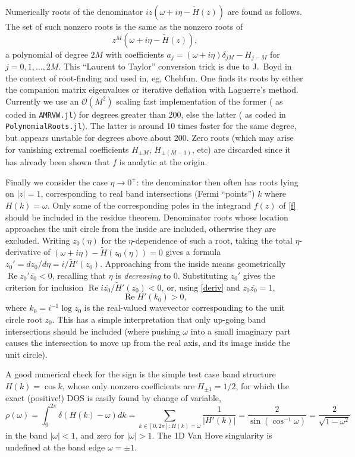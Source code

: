 \documentclass[11pt]{article}
\newcommand{\bigO}{{\mathcal O}}
\DeclareMathOperator{\re}{Re}
\newcommand{\om}{\omega}
\newcommand{\tH}{\tilde H}
\begin{document}
Numerically roots of the denominator $iz(\om + i\eta - \tH(z))$
are found as follows.
The set of such nonzero roots is the same as the nonzero roots of
$$
z^M(\om + i\eta - \tH(z)),
$$
a polynomial of degree $2M$ with coefficients
$a_j = (\om+i\eta)\delta_{jM} - H_{j-M}$ for $j=0,1,\dots,2M$.
This ``Laurent to Taylor'' conversion
trick is due to J.\ Boyd in the context of root-finding and used in, eg,
Chebfun.
One finds its roots by either the companion matrix
eigenvalues or iterative deflation with Laguerre's method.
Currently we use an $\bigO(M^2)$ scaling fast implementation of the former
(\cite{aurentz1,aurentz2} as coded in \texttt{AMRVW.jl})
for degrees greater than 200, else the
latter (\cite{skowron} as coded in \texttt{PolynomialRoots.jl}).
The latter is around 10 times faster for the same degree, but
appears unstable for degrees above about 200.
Zero roots (which may arise for vanishing extremal coefficients
$H_{\pm M}$, $H_{\pm (M-1)}$, etc) are discarded since it has
already been shown that $f$ is analytic at the origin.

Finally we consider
the case $\eta\to0^+$: the denominator then often has roots lying on $|z|=1$,
corresponding to real band intersections (Fermi ``points'')
$k$ where $H(k)=\om$.
Only some of the corresponding poles in the integrand $f(z)$ of \eqref{f}
should be included in the residue theorem.
Denominator roots whose location approaches the unit circle from the inside
are included, otherwise they are excluded.
Writing $z_0(\eta)$ for the $\eta$-dependence of such a root,
taking the total $\eta$-derivative of $(\om+i\eta)-\tH(z_0(\eta)) = 0$
gives a formula $z_0' = dz_0/d\eta = i/\tH'(z_0)$.
Approaching from the inside means geometrically
$\re z_0' \overline{z_0}<0$, recalling
that $\eta$ is \textit{decreasing} to $0$.
Substituting $z_0'$ gives the criterion for inclusion
$\re i \overline{z_0}/\tH'(z_0) <0$, or, using \eqref{deriv}
and $z_0\overline{z_0} = 1$,
$$
\re H'(k_0) > 0,
$$
where $k_0 = i^{-1} \log z_0$ is the real-valued wavevector corresponding to
the unit circle root $z_0$.
This has a simple interpretation that only up-going band intersections
should be included (where pushing $\om$ into a small imaginary
part causes the intersection to move up from the real axis, and its
image inside the unit circle).

A good numerical check for the sign is the simple test case band structure
$H(k) = \cos k$, whose only nonzero coefficients are $H_{\pm1} = 1/2$,
for which the exact (positive!) DOS is easily found by change of variable,
$$
\rho(\om) = \int_0^{2\pi} \delta(H(k)-\om) dk
= \sum_{k\in[0,2\pi]: H(k)=\om} \frac{1}{|H'(k)|}
= \frac{2}{\sin(\cos^{-1} \om)} = \frac{2}{\sqrt{1-\om^2}}
$$
in the band $|\om|<1$, and zero for $|\om|>1$.
The 1D Van Hove singularity is undefined at the band edge $\om=\pm1$.
\end{document}

